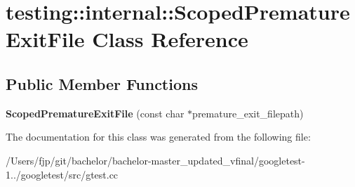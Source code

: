 \hypertarget{classtesting_1_1internal_1_1_scoped_premature_exit_file}{}\section{testing\+:\+:internal\+:\+:Scoped\+Premature\+Exit\+File Class Reference}
\label{classtesting_1_1internal_1_1_scoped_premature_exit_file}
\subsection*{Public Member Functions}
\begin{DoxyCompactItemize}
\item 
\mbox{\label{classtesting_1_1internal_1_1_scoped_premature_exit_file_ae520883b8a6984a864ce675acedff4a2}} 
{\bfseries Scoped\+Premature\+Exit\+File} (const char $\ast$premature\+\_\+exit\+\_\+filepath)
\end{DoxyCompactItemize}


The documentation for this class was generated from the following file\+:\begin{DoxyCompactItemize}
\item 
/\+Users/fjp/git/bachelor/bachelor-\/master\+\_\+updated\+\_\+vfinal/googletest-\/1../googletest/src/gtest.\+cc\end{DoxyCompactItemize}
